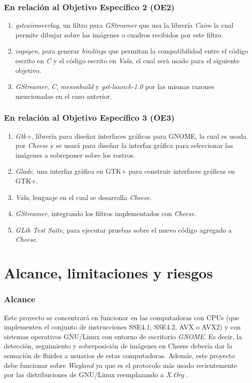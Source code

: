 \documentclass[a4paper,openright,12pt]{report}
\begin{document}
\subsubsection{En relación al Objetivo Específico 2 (OE2)}
\begin{enumerate}
    \item \textit{\gls{gstcairooverlay}}, un filtro para \textit{GStreamer} que usa
        la librería \textit{Cairo} la cual permite dibujar sobre las imágenes o
        cuadros recibidos por este filtro.
    \item \textit{vapigen}, para generar \textit{bindings} que permitan la
        compatibilidad entre el código escrito en \textit{C} y el código escrito
        en \textit{Vala}, el cual será usado para el siguiente objetivo.
    \item \textit{GStreamer}, \textit{C}, \textit{mesonbuild} y
        \textit{gst-launch-1.0} por las mismas razones mencionadas en el caso
        anterior.
\end{enumerate}

\subsubsection{En relación al Objetivo Específico 3 (OE3)}
\begin{enumerate}
    \item \textit{Gtk+}, librería para diseñar interfaces gráficas para GNOME,
        la cual es usada por \textit{Cheese} y se usará para diseñar la
        interfaz gráfica para seleccionar las imágenes a sobreponer sobre
        los rostros.
    \item \textit{Glade}, una interfaz gráfica en GTK+ para construir interfaces
        gráficas en GTK+.
    \item \textit{Vala}, lenguaje en el cual se desarrolla \textit{Cheese}.
    \item \textit{GStreamer}, integrando los filtros implementados con
        \textit{Cheese}.
    \item \textit{GLib Test Suite}, para ejecutar pruebas sobre el nuevo código
        agregado a \textit{Cheese}.
\end{enumerate}

\section{Alcance, limitaciones y riesgos}

\subsubsection{Alcance}
    Este proyecto se concentrará en funcionar en las computadoras con CPUs (que
    implementen el conjunto de instrucciones SSE4.1, SSE4.2, AVX o AVX2) y
    con sistemas operativos GNU/Linux con entorno de escritorio \textit{GNOME}.
    Es decir, la detección, seguimiento y
    sobreposición de imágenes en Cheese debería dar la sensación de fluidez a
    usuarios de estas computadoras. Además, este proyecto debe funcionar sobre
    \textit{Wayland} ya que es el protocolo más usado recientemente por las
    distribuciones de GNU/Linux reemplazando a \textit{X.Org}
    \cite{LinuxMagazineWaylandStrong}.
\end{document}

